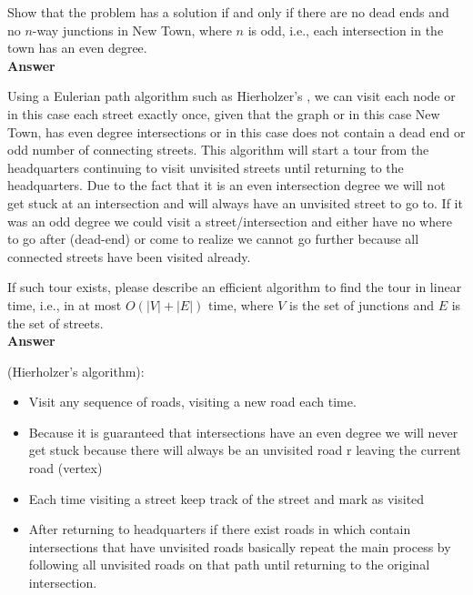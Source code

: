 \documentclass{article}
\begin{document}
 Show that the problem has a solution if and only if
there are no dead ends and no $n$-way junctions in New Town, where $n$
is odd, i.e., each intersection in the town has an even degree.\\

\textbf{ Answer }
\vspace{0.1in}
\begin{adjustwidth}{1.8em}{0pt}
Using a Eulerian path algorithm such as Hierholzer's , we can visit each node or in this case each street exactly once, given that the graph or in this case New Town, has even degree intersections or in this case does not contain a dead end or odd number of connecting streets. This algorithm will start a tour from the headquarters continuing to visit unvisited streets until returning to the headquarters. Due to the fact that it is an even intersection degree we will not get stuck at an intersection and will always have an unvisited street to go to. If it was an odd degree we could visit a street/intersection and either have no where to go after (dead-end) or come to realize we cannot go further because all connected streets have been visited already.
\end{adjustwidth}

\vspace{0.1in}

 If such tour exists, please describe an efficient
algorithm to find the tour in linear time, i.e., in at most $O(|V| +
|E|)$ time, where $V$ is the set of junctions and $E$ is the set of
streets.\\

\textbf{ Answer }
\vspace{0.1in}
\begin{adjustwidth}{1.8em}{0pt}
(Hierholzer's algorithm):
\begin{itemize}
\item Visit any sequence of roads, visiting a new road each time.
\item Because it is guaranteed that intersections have an even degree we will never get stuck because there will always be an unvisited road r leaving the current road (vertex)
\item Each time visiting a street keep track of the street and mark as visited
\item After returning to headquarters if there exist roads in which contain intersections that have unvisited roads basically repeat the main process by following all unvisited roads on that path until returning to the original intersection.
\end{itemize}
\end{adjustwidth}
\end{document}
